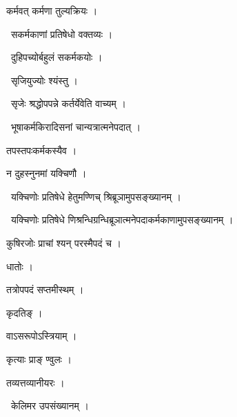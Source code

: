 \documentclass[10pt, openany, oneside]{book}
\begin{document}
\noindent कर्मवत् कर्मणा तुल्यक्रियः ।

\par\noindent\hspace{1.5em}{\vps वा॰}~{\qt सकर्मकाणां प्रतिषेधो वक्तव्यः ।}

\par\noindent\hspace{1.5em}{\vps वा॰}~{\qt दुहिपच्योर्बहुलं सकर्मकयोः ।}

\par\noindent\hspace{1.5em}{\vps वा॰}~{\qt सृजियुज्योः श्यंस्तु ।}

\par\noindent\hspace{1.5em}{\vps वा॰}~{\qt सृजेः श्रद्धोपपन्ने कर्तर्येवेति वाच्यम् ।}

\par\noindent\hspace{1.5em}{\vps वा॰}~{\qt भूषाकर्मकिरादिसनां चान्यत्रात्मनेपदात् ।}

\noindent तपस्तपःकर्मकस्यैव ।

\noindent न दुहस्नुनमां यक्चिणौ ।

\par\noindent\hspace{1.5em}{\vps वा॰}~{\qt यक्चिणोः प्रतिषेधे हेतुमण्णिच् श्रिब्रूञामुपसङ्ख्यानम् ।}

\par\noindent\hspace{1.5em}{\vps वा॰}~{\qt यक्चिणोः प्रतिषेधे णिश्रन्धिग्रन्धिब्रूञात्मनेपदाकर्मकाणामुपसङ्ख्यानम् ।}

\noindent कुषिरजोः प्राचां श्यन् परस्मैपदं च ।

\noindent धातोः ।

\noindent तत्रोपपदं सप्तमीस्थम् ।

\noindent कृदतिङ् ।

\noindent वाऽसरूपोऽस्त्रियाम् ।

\noindent कृत्याः प्राङ् ण्वुलः ।

\noindent तव्यत्तव्यानीयरः ।

\par\noindent\hspace{1.5em}{\vps वा॰}~{\qt केलिमर उपसंख्यानम् ।}
\end{document}
